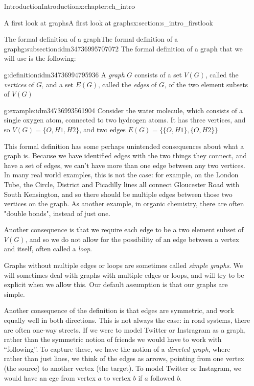 \documentclass[oneside,10pt,]{book}
\numberwithin{equation}{section}
\begin{document}
\begin{chapterptx}{Introduction}{}{Introduction}{}{}{x:chapter:ch_intro}
\begin{sectionptx}{A first look at graphs}{}{A first look at graphs}{}{}{x:section:s_intro_firstlook}
\typeout{************************************************}
%
\begin{subsectionptx}{The formal definition of a graph}{}{The formal definition of a graph}{}{}{g:subsection:idm34736995707072}
The formal definition of a graph that we will use is the following:%
\begin{definition}{}{g:definition:idm34736994795936}%
A \emph{graph} \(G\) consists of a set \(V(G)\), called the \emph{vertices} of \(G\), and a set \(E(G)\), called the \emph{edges} of \(G\), of the two element subsets of \(V(G)\)%
\end{definition}
\begin{example}{}{g:example:idm34736993561904}%
Consider the water molecule, which consists of a single oxygen atom, connected to two hydrogen atoms.  It has three vertices, and so \(V(G)=\{O, H1, H2\}\), and two edges \(E(G)=\big\{\{O, H1\},\{O,H2\}\big\}\)%
\end{example}
This formal definition has some perhaps unintended consequences about what a graph is.  Because we have identified edges with the two things they connect, and have a set of edges, we can't have more than one edge between any two vertices.  In many real world examples, this is not the case: for example, on the London Tube, the Circle, District and Picadilly lines all connect Gloucester Road with South Kensington, and so there should be multiple edges between those two vertices on the graph.  As another example, in organic chemistry, there are often "double bonds", instead of just one.%
\par
Another consequence is that we require each edge to be a two element subset of \(V(G)\), and so we do not allow for the possibility of an edge between a vertex and itself, often called a \emph{loop}.%
\par
Graphs without multiple edges or loops are sometimes called \emph{simple graphs}.  We will sometimes deal with graphs with multiple edges or loops, and will try to be explicit when we allow this.  Our default assumption is that our graphs are simple.%
\par
Another consequence of the definition is that edges are symmetric, and work equally well in both directions.  This is not always the case: in road systems, there are often one-way streets.  If we were to model Twitter or Instragram as a graph, rather than the symmetric notion of friends we would have to work with ``following''.  To capture these, we have the notion of a \emph{directed graph}, where rather than just lines, we think of the edges as arrows, pointing from one vertex (the source) to another vertex (the target).  To model Twitter or Instagram, we would have an ege from vertex \(a\) to vertex \(b\) if \(a\) followed \(b\).%

\end{subsectionptx}
\end{sectionptx}
\end{chapterptx}
\end{document}

